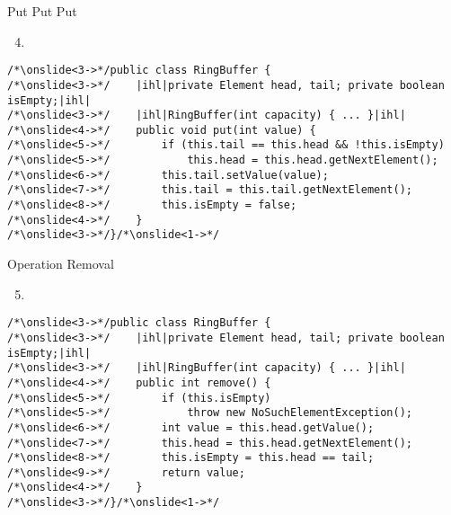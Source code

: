 {\begin{frame}[fragile]{Put Put Put}
\begin{enumerate}[<+(1)->]
    \setcounter{enumi}{3}
    \item {}
\end{enumerate}
\SetupLstHl
\begin{verbatim}
/*\onslide<3->*/public class RingBuffer {
/*\onslide<3->*/    |ihl|private Element head, tail; private boolean isEmpty;|ihl|
/*\onslide<3->*/    |ihl|RingBuffer(int capacity) { ... }|ihl|
/*\onslide<4->*/    public void put(int value) {
/*\onslide<5->*/        if (this.tail == this.head && !this.isEmpty)
/*\onslide<5->*/            this.head = this.head.getNextElement();
/*\onslide<6->*/        this.tail.setValue(value);
/*\onslide<7->*/        this.tail = this.tail.getNextElement();
/*\onslide<8->*/        this.isEmpty = false;
/*\onslide<4->*/    }
/*\onslide<3->*/}/*\onslide<1->*/
\end{verbatim}
\end{frame}

\begin{frame}[fragile]{Operation Removal}
\begin{enumerate}[<+(1)->]
    \setcounter{enumi}{4}
    \item {}
\end{enumerate}
\SetupLstHl
\begin{verbatim}
/*\onslide<3->*/public class RingBuffer {
/*\onslide<3->*/    |ihl|private Element head, tail; private boolean isEmpty;|ihl|
/*\onslide<3->*/    |ihl|RingBuffer(int capacity) { ... }|ihl|
/*\onslide<4->*/    public int remove() {
/*\onslide<5->*/        if (this.isEmpty)
/*\onslide<5->*/            throw new NoSuchElementException();
/*\onslide<6->*/        int value = this.head.getValue();
/*\onslide<7->*/        this.head = this.head.getNextElement();
/*\onslide<8->*/        this.isEmpty = this.head == tail;
/*\onslide<9->*/        return value;
/*\onslide<4->*/    }
/*\onslide<3->*/}/*\onslide<1->*/
\end{verbatim}
\end{frame}
}
\iffull
{}

